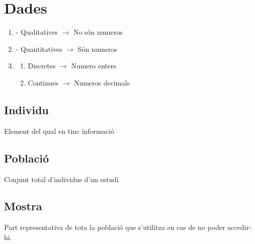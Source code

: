 \documentclass[12pt,a4paper]{article}
\title{}
\author{-}
\date{2022 - 2023}
\begin{document}
\maketitle
\section{Dades}
\begin{enumerate}[label=]
    \item - Qualitatives $\rightarrow$ No són numeros
    \item - Quantitatives $\rightarrow$ Són numeros
    \item \begin{enumerate}[label=-]
        \item Discretes $\rightarrow$ Numero enters
        \item Continues $\rightarrow$ Numeros decimals
    \end{enumerate}
\end{enumerate}

\subsection{Individu}
Element del qual en tinc informació
\subsection{Població}
Conjunt total d'individus d'un estudi
\subsection{Mostra}
Part representativa de tota la població que s'utilitza en cas de no poder accedir-hi.
\end{document}
